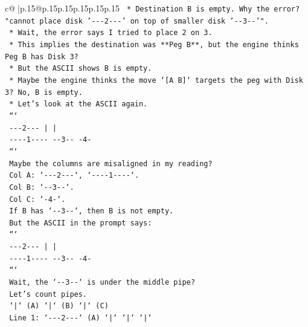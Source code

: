 \documentclass{article}
\begin{document}
{\begin{supertabular}{c@{$\;$}|p{.15\linewidth}@{}p{.15\linewidth}p{.15\linewidth}p{.15\linewidth}p{.15\linewidth}p{.15\linewidth}}
{{{\texttt{            *   Destination B is empty. Why the error? "cannot place disk '{-}{-}{-}2{-}{-}{-}' on top of smaller disk '{-}{-}3{-}{-}'".} \\
\texttt{            *   Wait, the error says I tried to place 2 on 3.} \\
\texttt{            *   This implies the destination was **Peg B**, but the engine thinks Peg B has Disk 3?} \\
\texttt{            *   But the ASCII shows B is empty.} \\
\texttt{            *   Maybe the engine thinks the move `{[}A B{]}` targets the peg with Disk 3? No, B is empty.} \\
\texttt{            *   Let's look at the ASCII again.} \\
\texttt{                ```} \\
\texttt{                {-}{-}{-}2{-}{-}{-}      |         |    } \\
\texttt{                {-}{-}{-}{-}1{-}{-}{-}{-}   {-}{-}3{-}{-}      {-}4{-}   } \\
\texttt{                ```} \\
\texttt{                Maybe the columns are misaligned in my reading?} \\
\texttt{                Col A: `{-}{-}{-}2{-}{-}{-}`, `{-}{-}{-}{-}1{-}{-}{-}{-}`.} \\
\texttt{                Col B: `{-}{-}3{-}{-}`.} \\
\texttt{                Col C: `{-}4{-}`.} \\
\texttt{                If B has `{-}{-}3{-}{-}`, then B is not empty.} \\
\texttt{                But the ASCII in the prompt says:} \\
\texttt{                ```} \\
\texttt{                {-}{-}{-}2{-}{-}{-}      |         |    } \\
\texttt{                {-}{-}{-}{-}1{-}{-}{-}{-}   {-}{-}3{-}{-}      {-}4{-}   } \\
\texttt{                ```} \\
\texttt{                Wait, the `{-}{-}3{-}{-}` is under the middle pipe?} \\
\texttt{                Let's count pipes.} \\
\texttt{                `|` (A) `|` (B) `|` (C)} \\
\texttt{                Line 1: `{-}{-}{-}2{-}{-}{-}` (A) `|` `|` `|`} \\
}}}
\end{supertabular}}
\end{document}
